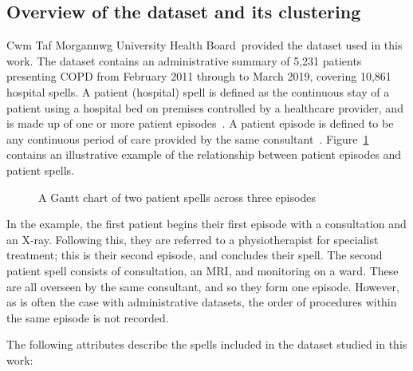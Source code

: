 \documentclass[]{interact}
\newlength{\imgwidth}
\theoremstyle{plain}%
\theoremstyle{definition}
\theoremstyle{remark}
\newcommand{\ctmuhb}{Cwm Taf Morgannwg University Health Board}
\begin{document}
\subsection{Overview of the dataset and its clustering}\label{subsec:overview}

\ctmuhb\ provided the dataset used in this work. The dataset contains an
administrative summary of 5,231 patients presenting COPD from February 2011
through to March 2019, covering 10,861 hospital spells. A patient (hospital)
spell is defined as the continuous stay of a patient using a hospital bed on
premises controlled by a healthcare provider, and is made up of one or more
patient episodes~\citep{NHS:spell}. A patient episode is defined to be any
continuous period of care provided by the same consultant~\citep{NHS:episode}.
Figure~\ref{fig:spell} contains an illustrative example of the relationship
between patient episodes and patient spells.

\begin{figure}
    \centering
    \resizebox{\imgwidth}{!}{}
    \caption{A Gantt chart of two patient spells across three episodes}
    \label{fig:spell}
\end{figure}

In the example, the first patient begins their first episode with a consultation
and an X-ray. Following this, they are referred to a physiotherapist for
specialist treatment; this is their second episode, and concludes their spell.
The second patient spell consists of consultation, an MRI, and monitoring on a
ward. These are all overseen by the same consultant, and so they form one
episode. However, as is often the case with administrative datasets, the order
of procedures within the same episode is not recorded.

The following attributes describe the spells included in the dataset studied in
this work:
\end{document}
